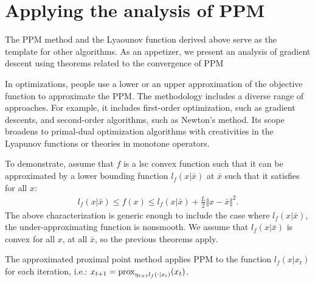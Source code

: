 \documentclass[12pt]{article}
\begin{document}
\section{Applying the analysis of PPM}
    The PPM method and the Lyaounov function derived above serve as the template for other algorithms. 
    As an appetizer, we present an analysis of gradient descent using theorems related to the convergence of PPM
    \par\noindent
    In optimizations, people use a lower or an upper approximation of the objective function to approximate the PPM. 
    The methodology includes a diverse range of approaches.
    For example, it includes first-order optimization, such as gradient descents, and second-order algorithms, such as Newton's method. 
    Its scope broadens to primal-dual optimization algorithms with creativities in the Lyapunov functions or theories in monotone operators. 
    \par\noindent
    To demonstrate, assume that $f$ is a lsc convex function such that it can be approximated by a lower bounding function $l_f(x|\bar x)$ at $\bar x$ such that it satisfies for all $x$: 
    \begin{align*}
        l_f(x| \bar x) 
        \le f(x) \le l_f(x|\bar x) + \frac{L}{2}\Vert x - \bar x\Vert^2. 
    \end{align*}
    The above characterization is generic enough to include the case where $l_f(x|\bar x)$, the under-approximating function is nonsmooth. 
    We assume that $l_f(x|\bar x)$ is convex for all $x$, at all $\bar x$, so the previous theorems apply. 
    \par\noindent
    The approximated proximal point method applies PPM to the function $l_f(x|x_t)$ for each iteration, i.e.: $x_{t +1} = \operatorname{prox}_{\eta_{t + 1}l_f(\cdot | x_t)}(x_t)$. 
\end{document}
